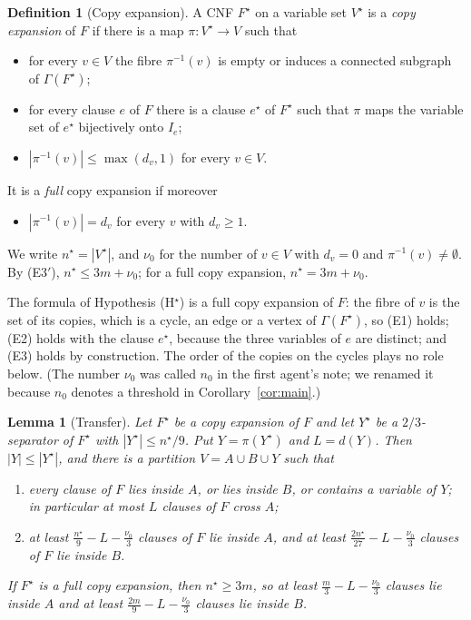 \documentclass[11pt,a4paper]{article}
\newtheorem{lemma}[theorem]{Lemma}
\theoremstyle{definition}
\newtheorem{definition}[theorem]{Definition}
\theoremstyle{remark}
\newcommand{\Gr}{\Gamma}
\begin{document}
\begin{definition}[Copy expansion]\label{def:copy}
A CNF $F^\star$ on a variable set $V^\star$ is a \emph{copy expansion} of $F$ if there is a
map $\pi:V^\star\to V$ such that
\begin{itemize}
\item[(E1)] for every $v\in V$ the fibre $\pi^{-1}(v)$ is empty or induces a connected
 subgraph of $\Gr(F^\star)$;
\item[(E2)] for every clause $e$ of $F$ there is a clause $e^\star$ of $F^\star$ such that
 $\pi$ maps the variable set of $e^\star$ bijectively onto $I_e$;
\item[(E3$'$)] $|\pi^{-1}(v)|\le\max(d_v,1)$ for every $v\in V$.
\end{itemize}
It is a \emph{full} copy expansion if moreover
\begin{itemize}
\item[(E3)] $|\pi^{-1}(v)|=d_v$ for every $v$ with $d_v\ge1$.
\end{itemize}
We write $n^\star=|V^\star|$, and $\nu_0$ for the number of $v\in V$ with $d_v=0$ and
$\pi^{-1}(v)\ne\emptyset$. By (E3$'$), $n^\star\le3m+\nu_0$; for a full copy expansion,
$n^\star=3m+\nu_0$.
\end{definition}

The formula of Hypothesis (H$^\star$) is a full copy expansion of $F$: the fibre of $v$ is
the set of its copies, which is a cycle, an edge or a vertex of $\Gr(F^\star)$, so (E1)
holds; (E2) holds with the clause $e^\star$, because the three variables of $e$ are
distinct; and (E3) holds by construction. The order of the copies on the cycles plays no
role below. (The number $\nu_0$ was called $n_0$ in the first agent's note; we renamed it
because $n_0$ denotes a threshold in Corollary~\ref{cor:main}.)

\begin{lemma}[Transfer]\label{lem:T}
Let $F^\star$ be a copy expansion of $F$ and let $Y^\star$ be a $2/3$-separator of $F^\star$
with $|Y^\star|\le n^\star/9$. Put $Y=\pi(Y^\star)$ and $L=d(Y)$. Then $|Y|\le|Y^\star|$,
and there is a partition $V=A\cup B\cup Y$ such that
\begin{enumerate}
\item[\textup{(1)}] every clause of $F$ lies inside $A$, or lies inside $B$, or contains a
 variable of $Y$; in particular at most $L$ clauses of $F$ cross $A$;
\item[\textup{(2)}] at least $\frac{n^\star}{9}-L-\frac{\nu_0}{3}$ clauses of $F$ lie inside
 $A$, and at least $\frac{2n^\star}{27}-L-\frac{\nu_0}{3}$ clauses of $F$ lie inside $B$.
\end{enumerate}
If $F^\star$ is a full copy expansion, then $n^\star\ge3m$, so at least
$\frac m3-L-\frac{\nu_0}3$ clauses lie inside $A$ and at least
$\frac{2m}9-L-\frac{\nu_0}3$ clauses lie inside $B$.
\end{lemma}
\end{document}

